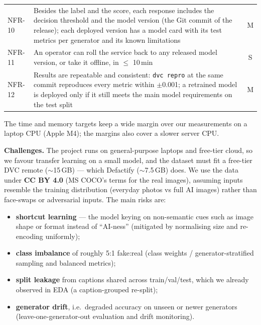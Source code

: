 \documentclass[11pt]{article}
\begin{document}
\begin{tabularx}{\textwidth}{@{}l Y c@{}}
NFR-10 & Besides the label and the score, each response includes the decision threshold and the model version (the Git commit of the release); each deployed version has a model card with its test metrics per generator and its known limitations & M \medskip \\
NFR-11 & An operator can roll the service back to any released model version, or take it offline, in $\leq$ 10\,min & S \medskip \\
NFR-12 & Results are repeatable and consistent: \texttt{dvc repro} at the same commit reproduces every metric within $\pm$0.001; a retrained model is deployed only if it still meets the main model requirements on the test split & M \\
\bottomrule
\end{tabularx}

\smallskip
\noindent The time and memory targets keep a wide margin over our measurements on a laptop CPU (Apple M4); the margins also cover a slower server CPU.

\medskip
\medskip

\newpage

\medskip\noindent\textbf{Challenges.}
The project runs on general-purpose laptops and free-tier cloud, so we favour transfer learning on a small model, and the dataset must fit a free-tier DVC remote ($\sim$15\,GB) --- which Defactify ($\sim$7.5\,GB) does. We use the data under \textbf{CC BY 4.0} (MS COCO's terms for the real images), assuming inputs resemble the training distribution (everyday photos vs full AI images) rather than face-swaps or adversarial inputs. The main risks are:
\begin{itemize}[nosep,leftmargin=1.4em]

\medskip

  \item \textbf{shortcut learning} --- the model keying on non-semantic cues such as image shape or format instead of ``AI-ness'' (mitigated by normalising size and re-encoding uniformly);

\medskip

  \item \textbf{class imbalance} of roughly 5:1 fake:real (class weights / generator-stratified sampling and balanced metrics);

\medskip


  \item \textbf{split leakage} from captions shared across train/val/test, which we already observed in EDA (a caption-grouped re-split);

\medskip

  \item \textbf{generator drift}, i.e.\ degraded accuracy on unseen or newer generators (leave-one-generator-out evaluation and drift monitoring).
\end{itemize}
\end{document}
